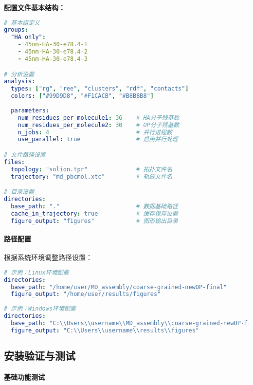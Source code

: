 \textbf{配置文件基本结构：}
\begin{lstlisting}[language=yaml,style=blockstyle]
# 基本组定义
groups:
  "HA only":
    - 45nm-HA-30-e78.4-1
    - 45nm-HA-30-e78.4-2
    - 45nm-HA-30-e78.4-3

# 分析设置
analysis:
  types: ["rg", "ree", "clusters", "rdf", "contacts"]
  colors: ["#99D9D8", "#F1CACB", "#B8B8B8"]
  
  parameters:
    num_residues_per_molecule1: 36    # HA分子残基数
    num_residues_per_molecule2: 30    # OP分子残基数
    n_jobs: 4                         # 并行进程数
    use_parallel: true                # 启用并行处理

# 文件路径设置
files:
  topology: "solion.tpr"              # 拓扑文件名
  trajectory: "md_pbcmol.xtc"         # 轨迹文件名

# 目录设置
directories:
  base_path: "."                      # 数据基础路径
  cache_in_trajectory: true           # 缓存保存位置
  figure_output: "figures"            # 图形输出目录
\end{lstlisting}

\paragraph{路径配置}

根据系统环境调整路径设置：

\begin{lstlisting}[language=yaml,style=blockstyle]
# 示例：Linux环境配置
directories:
  base_path: "/home/user/MD_assembly/coarse-grained-newOP-final"
  figure_output: "/home/user/results/figures"
  
# 示例：Windows环境配置
directories:
  base_path: "C:\\Users\\username\\MD_assembly\\coarse-grained-newOP-final"
  figure_output: "C:\\Users\\username\\results\\figures"
\end{lstlisting}

\subsection{安装验证与测试}
\label{subsec:installation_verification}

\paragraph{基础功能测试}

